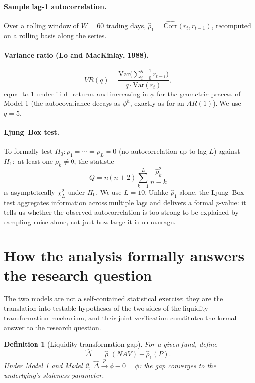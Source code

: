 \documentclass[11pt]{article}
\newtheorem{definition}{Definition}
\begin{document}
\paragraph{Sample lag-1 autocorrelation.} Over a rolling window of $W=60$ trading days, $\hat\rho_1 = \widehat{\mathrm{Corr}}(r_t, r_{t-1})$, recomputed on a rolling basis along the series.

\paragraph{Variance ratio (Lo and MacKinlay, 1988).}
\[
VR(q) = \frac{\mathrm{Var}\big(\sum_{i=0}^{q-1} r_{t-i}\big)}{q\cdot\mathrm{Var}(r_t)},
\]
equal to $1$ under i.i.d.\ returns and increasing in $\phi$ for the geometric process of Model 1 (the autocovariance decays as $\phi^h$, exactly as for an $AR(1)$). We use $q=5$.

\paragraph{Ljung--Box test.} To formally test $H_0: \rho_1=\cdots=\rho_L=0$ (no autocorrelation up to lag $L$) against $H_1:$ at least one $\rho_k\ne 0$, the statistic
\[
Q = n(n+2)\sum_{k=1}^{L}\frac{\hat\rho_k^2}{n-k}
\]
is asymptotically $\chi^2_L$ under $H_0$. We use $L=10$. Unlike $\hat\rho_1$ alone, the Ljung--Box test aggregates information across multiple lags and delivers a formal $p$-value: it tells us whether the observed autocorrelation is too strong to be explained by sampling noise alone, not just how large it is on average.

\section{How the analysis formally answers the research question}
\label{sec:formal-answer}

The two models are not a self-contained statistical exercise: they are the translation into testable hypotheses of the two sides of the liquidity-transformation mechanism, and their joint verification constitutes the formal answer to the research question.

\begin{definition}[Liquidity-transformation gap]
For a given fund, define
\[
\widehat{\Delta} \;=\; \hat\rho_1(NAV) - \hat\rho_1(P).
\]
Under Model 1 and Model 2, $\widehat{\Delta}\xrightarrow{p}\phi - 0 = \phi$: the gap converges to the underlying's staleness parameter.
\end{definition}
\end{document}
